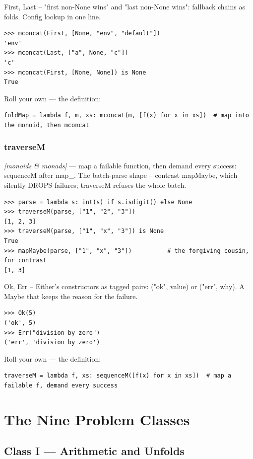 \documentclass[11pt,letterpaper]{book}
\begin{document}
First, Last -- "first non-None wins" and "last non-None wins": fallback chains as folds. Config lookup in one line.

\begin{lstlisting}[style=spec]
>>> mconcat(First, [None, "env", "default"])
'env'
>>> mconcat(Last, ["a", None, "c"])
'c'
>>> mconcat(First, [None, None]) is None
True
\end{lstlisting}

Roll your own --- the definition:

\begin{lstlisting}[style=code]
foldMap = lambda f, m, xs: mconcat(m, [f(x) for x in xs])  # map into the monoid, then mconcat
\end{lstlisting}

\section{traverseM}
\noindent\textit{[monoids \& monads]} --- map a failable function, then demand every success: sequenceM after map\_. The batch-parse shape -- contrast mapMaybe, which silently DROPS failures; traverseM refuses the whole batch.
\begin{lstlisting}[style=spec]
>>> parse = lambda s: int(s) if s.isdigit() else None
>>> traverseM(parse, ["1", "2", "3"])
[1, 2, 3]
>>> traverseM(parse, ["1", "x", "3"]) is None
True
>>> mapMaybe(parse, ["1", "x", "3"])          # the forgiving cousin, for contrast
[1, 3]
\end{lstlisting}

Ok, Err -- Either's constructors as tagged pairs: ("ok", value) or ("err", why). A Maybe that keeps the reason for the failure.

\begin{lstlisting}[style=spec]
>>> Ok(5)
('ok', 5)
>>> Err("division by zero")
('err', 'division by zero')
\end{lstlisting}

Roll your own --- the definition:

\begin{lstlisting}[style=code]
traverseM = lambda f, xs: sequenceM([f(x) for x in xs])  # map a failable f, demand every success
\end{lstlisting}
\part{The Nine Problem Classes}
\chapter{Class I --- Arithmetic and Unfolds}
\end{document}
